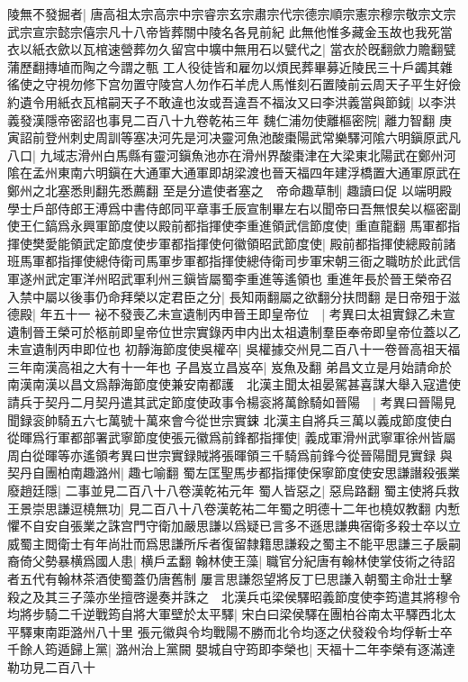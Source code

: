 陵無不發掘者|{
	唐高祖太宗高宗中宗睿宗玄宗肅宗代宗德宗順宗憲宗穆宗敬宗文宗武宗宣宗懿宗僖宗凡十八帝皆葬關中陵名各見前紀}
此無他惟多藏金玉故也我死當衣以紙衣歛以瓦棺速營葬勿久留宫中壙中無用石以甓代之|{
	當衣於旣翻歛力贍翻甓蒲歷翻摶埴而陶之今謂之甎}
工人役徒皆和雇勿以煩民葬畢募近陵民三十戶蠲其雜徭使之守視勿修下宫勿置守陵宫人勿作石羊虎人馬惟刻石置陵前云周天子平生好儉約遺令用紙衣瓦棺嗣天子不敢違也汝或吾違吾不福汝又曰李洪義當與節鉞|{
	以李洪義發漢隱帝密詔也事見二百八十九卷乾祐三年}
魏仁浦勿使離樞密院|{
	離力智翻}
庚寅詔前登州刺史周訓等塞决河先是河决靈河魚池酸棗陽武常樂驛河隂六明鎭原武凡八口|{
	九域志滑州白馬縣有靈河鎭魚池亦在滑州界酸棗津在大梁東北陽武在鄭州河隂在孟州東南六明鎭在大通軍大通軍即胡梁渡也晉天福四年建浮橋置大通軍原武在鄭州之北塞悉則翻先悉薦翻}
至是分遣使者塞之　帝命趣草制|{
	趣讀曰促}
以端明殿學士戶部侍郎王溥爲中書侍郎同平章事壬辰宣制畢左右以聞帝曰吾無恨矣以樞密副使王仁鎬爲永興軍節度使以殿前都指揮使李重進領武信節度使|{
	重直龍翻}
馬軍都指揮使樊愛能領武定節度使步軍都指揮使何徽領昭武節度使|{
	殿前都指揮使總殿前諸班馬軍都指揮使總侍衛司馬軍步軍都指揮使總侍衛司步軍宋朝三衙之職昉於此武信軍遂州武定軍洋州昭武軍利州三鎭皆屬蜀李重進等遙領也}
重進年長於晉王榮帝召入禁中屬以後事仍命拜榮以定君臣之分|{
	長知兩翻屬之欲翻分扶問翻}
是日帝殂于滋德殿|{
	年五十一}
袐不發喪乙未宣遺制丙申晉王即皇帝位　|{
	考異曰太祖實録乙未宣遺制晉王榮可於柩前即皇帝位世宗實錄丙申内出太祖遺制羣臣奉帝即皇帝位蓋以乙未宣遺制丙申即位也}
初靜海節度使吳權卒|{
	吳權據交州見二百八十一卷晉高祖天福三年南漢高祖之大有十一年也}
子昌岌立昌岌卒|{
	岌魚及翻}
弟昌文立是月始請命於南漢南漢以昌文爲靜海節度使兼安南都護　北漢主聞太祖晏駕甚喜謀大舉入寇遣使請兵于契丹二月契丹遣其武定節度使政事令楊衮將萬餘騎如晉陽　|{
	考異曰晉陽見聞録衮帥騎五六七萬號十萬來會今從世宗實鋉}
北漢主自將兵三萬以義成節度使白從暉爲行軍都部署武寧節度使張元徽爲前鋒都指揮使|{
	義成軍滑州武寧軍徐州皆屬周白從暉等亦遙領考異曰世宗實録賊將張暉領三千騎爲前鋒今從晉陽聞見實録}
與契丹自團柏南趣潞州|{
	趣七喻翻}
蜀左匡聖馬步都指揮使保寧節度使安思謙譖殺張業廢趙廷隱|{
	二事並見二百八十八卷漢乾祐元年}
蜀人皆惡之|{
	惡烏路翻}
蜀主使將兵救王景崇思謙逗橈無功|{
	見二百八十八卷漢乾祐二年蜀之明德十二年也橈奴教翻}
内慙懼不自安自張業之誅宫門守衛加嚴思謙以爲疑已言多不遜思謙典宿衛多殺士卒以立威蜀主閲衛士有年尚壯而爲思謙所斥者復留隸籍思謙殺之蜀主不能平思謙三子扆嗣裔倚父勢暴横爲國人患|{
	横戶孟翻}
翰林使王藻|{
	職官分紀唐有翰林使掌伎術之待詔者五代有翰林茶酒使蜀蓋仍唐舊制}
屢言思謙怨望將反丁巳思謙入朝蜀主命壯士擊殺之及其三子藻亦坐擅啓邊奏并誅之　北漢兵屯梁侯驛昭義節度使李筠遣其將穆令均將步騎二千逆戰筠自將大軍壁於太平驛|{
	宋白曰梁侯驛在團柏谷南太平驛西北太平驛東南距潞州八十里}
張元徽與令均戰陽不勝而北令均逐之伏發殺令均俘斬士卒千餘人筠遁歸上黨|{
	潞州治上黨闕}
嬰城自守筠即李榮也|{
	天福十二年李榮有逐滿達勒功見二百八十}


